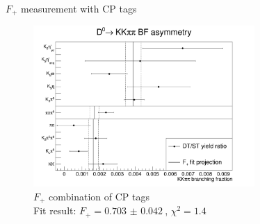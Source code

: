 \documentclass{beamer}
\begin{document}
\begin{frame}{$F_+$ measurement with CP tags}
  \begin{figure}
    \centering
    \includegraphics[width=0.75\textwidth]{Plots/CPeven_fraction_combination_CPtags.png}
    \caption{$F_+$ combination of CP tags\\Fit result: $F_+ = \SI{0.703(42)}{}$, $\chi^2 = 1.4$}
  \end{figure}
\end{frame}
\end{document}
